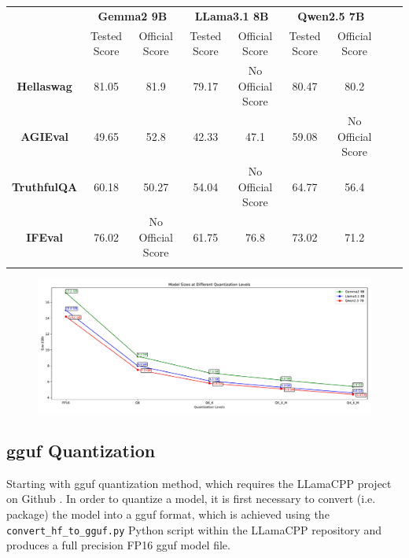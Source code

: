 \documentclass{ifacconf}
\begin{document}
	\begin{strip}
		\begin{minipage}{\textwidth}
            \centering
			\begin{tabular}{|c|c|c|c|c|c|c|c|c|}
				\hline
				\multirow{2}{*}{\textbf{}} &
				 \multicolumn{2}{c|}{\textbf{Gemma2 9B}} & \multicolumn{2}{c|}{\textbf{LLama3.1 8B}} & \multicolumn{2}{c|}{\textbf{Qwen2.5 7B}} \\
				\cline{2-7}& 
				Tested Score & Official Score &
				Tested Score & Official Score & 
				Tested Score & Official Score \\
				\hline
				\textbf{Hellaswag} & 81.05 & 81.9 & 79.17 & No Official Score & 80.47 & 80.2 \\
				\hline
				\textbf{AGIEval} & 49.65 & 52.8 & 42.33 & 47.1 & 59.08  & No Official Score \\
				\hline
				\textbf{TruthfulQA} & 60.18 & 50.27 & 54.04 & No Official Score & 64.77 & 56.4 \\
				\hline
				\textbf{IFEval} & 76.02 & No Official Score & 61.75 & 76.8 & 73.02 & 71.2 \\
				\hline
            \label{baseline-scores}
			\end{tabular}

            \begin{figure}[H]
            \centering
            \includegraphics[height=0.4\textwidth]{images/gguf-sizes.pdf}
            \label{fig:gguf-sizes}
            \end{figure}
		\end{minipage}
	\end{strip}

    \subsection{\gls{gguf} Quantization}
    Starting with \gls{gguf} quantization method, which requires the LLamaCPP project on Github \cite{llamacpp}. In order to quantize a model, it is first necessary to convert (i.e. package) the model into a \gls{gguf} format, which is achieved using the \verb|convert_hf_to_gguf.py| Python script within the LLamaCPP repository and produces a full precision FP16 \gls{gguf} model file.
\end{document}
